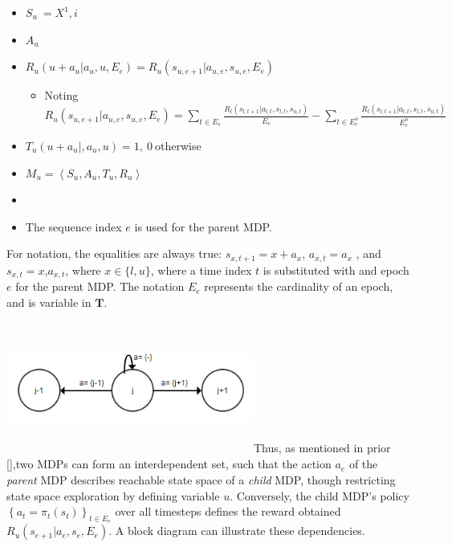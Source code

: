 \documentclass[]{article}
\begin{document}
\begin{itemize}
\item
  \(S_{u}\  = X^{1},i\)
\item
  \(A_{u}\)
\item
  \(R_{u}\left( u + a_{u}|a_{u},u,E_{e} \right) = R_{u}\left( s_{u,e + 1}|a_{u,e},s_{u,e},E_{e} \right)\)

  \begin{itemize}
  \item
    Noting
    \(R_{u}\left( s_{u,e + 1}|a_{u,e},s_{u,e},E_{e} \right) = \sum_{t \in E_{e}}^{\ }\frac{R_{l}\left( s_{l,t + 1}|a_{l,t},s_{l,t},s_{u,t} \right)}{\overset{}{E_{e}}} - \sum_{t \in E_{e}^{o}}^{\ }\frac{R_{l}\left( s_{l,t + 1}|a_{l,t},s_{l,t},s_{u,t} \right)}{\overset{}{E_{e}^{o}}}\)
  \end{itemize}
\item
  \(T_{u}\left( u + a_{u}|,a_{u},u \right) = 1,\ 0\ \)otherwise
\item
  \(M_{u} = \left\langle S_{u},A_{u},T_{u},R_{u} \right\rangle\)
\item
\item
  The sequence index \(e\) is used for the parent MDP.
\end{itemize}

For notation, the equalities are always true:
\(s_{x,t + 1} = x + a_{x}\), \(a_{x,t} = a_{x}\) ,
and\(s_{x,t} = x\),\(a_{x,t}\), where \(x \in \{ l,u\}\), where a time
index \(t\) is substituted with and epoch \(e\) for the parent MDP. The
notation \(\overset{}{E_{e}}\) represents the cardinality of an epoch,
and is variable in \(\mathbf{T}\).

\includegraphics[width=3.20833in,height=1.70208in]{media/image3.png}Thus,
as mentioned in prior {[}{]},two MDPs can form an interdependent set,
such that the action \(a_{e}\) of the \emph{parent} MDP describes
reachable state space of a \emph{child} MDP, though restricting state
space exploration by defining variable \(u\). Conversely, the child
MDP's policy
\(\left\{ a_{t} = \pi_{t}(s_{t}) \right\}_{t \in E_{e}}^{\ }\) over all
timesteps defines the reward obtained
\(R_{u}\left( s_{e + 1}|a_{e},s_{e},E_{e} \right)\). A block diagram can
illustrate these dependencies.
\end{document}
